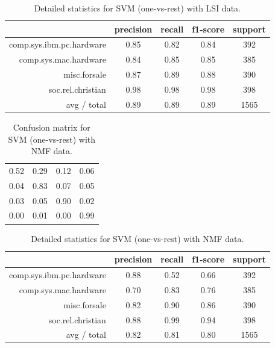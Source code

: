 \documentclass[letterpaper]{article}
\begin{document}
\begin{table}[H]
\centering
\begin{tabular}{r|cccc}
& precision & recall & f1-score & support \\ \hline
comp.sys.ibm.pc.hardware & 0.85 & 0.82 & 0.84 & 392 \\
comp.sys.mac.hardware & 0.84 & 0.85 & 0.85 & 385 \\
misc.forsale & 0.87 & 0.89 & 0.88 & 390 \\
soc.rel.christian & 0.98 & 0.98 & 0.98 & 398 \\
avg / total & 0.89 & 0.89 & 0.89 & 1565 \\
\end{tabular}
\caption{Detailed statistics for SVM (one-vs-rest) with LSI data.}
\end{table}

\begin{table}[H]
\centering
\begin{tabular}{cccc}
0.52 & 0.29 & 0.12 & 0.06 \\
0.04 & 0.83 & 0.07 & 0.05 \\
0.03 & 0.05 & 0.90 & 0.02 \\
0.00 & 0.01 & 0.00 & 0.99
\end{tabular}
\caption{Confusion matrix for SVM (one-vs-rest) with NMF data.}
\end{table}

\begin{table}[H]
\centering
\begin{tabular}{r|cccc}
& precision & recall & f1-score & support \\ \hline
comp.sys.ibm.pc.hardware & 0.88 & 0.52 & 0.66 & 392 \\
comp.sys.mac.hardware & 0.70 & 0.83 & 0.76 & 385 \\
misc.forsale & 0.82 & 0.90 & 0.86 & 390 \\
soc.rel.christian & 0.88 & 0.99 & 0.94 & 398 \\
avg / total & 0.82 & 0.81 & 0.80 & 1565 \\
\end{tabular}
\caption{Detailed statistics for SVM (one-vs-rest) with NMF data.}
\end{table}
\end{document}
